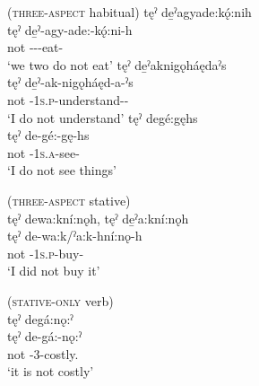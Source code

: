 \ea\label{ex:negationex3}  (\textsc{three-aspect} habitual)
\ea tęˀ de̱ˀagyade:kǫ́:nih\\
\gll tęˀ de̱ˀ-agy-ade:-kǫ́:ni-h\\
not  {\negative}--{\semireflexive}-eat-{\habitual}\\
\glt `we two do not eat'
\ex tęˀ de̱ˀaknigǫháędaˀs  \\
\gll tęˀ de̱ˀ-ak-nigǫháęd-a-ˀs\\
not  {\negative}-\textsc{1s.p}-understand-{\joinerA}-{\habitual}\\
\glt ‘I do not understand’
\ex tęˀ degé:gęhs  \\
\gll tęˀ de-gé:-gę-hs\\
not {\negative}-\textsc{1s.a}-see-{\habitual}\\
\glt ‘I do not see things’
\z
\z
 
\ea\label{ex:negationex4}  (\textsc{three-aspect} stative)\\
tęˀ dewa:kní:nǫh, tęˀ de̱ˀa:kní:nǫh  \\
\gll tęˀ de-wa:k/ˀa:k-hní:nǫ-h\\
not {\negative}-\textsc{1s.p}-buy-{\stative}\\
\glt ‘I did not buy it’
\z


\ea\label{ex:negationex5}  (\textsc{stative-only} verb)\\
tęˀ degá:nǫ:ˀ\\
\gll tęˀ de-gá:-nǫ:ˀ\\ 
not {\negative}-{3\sga}-costly.{\stative}\\
\glt `it is not costly'
\z


